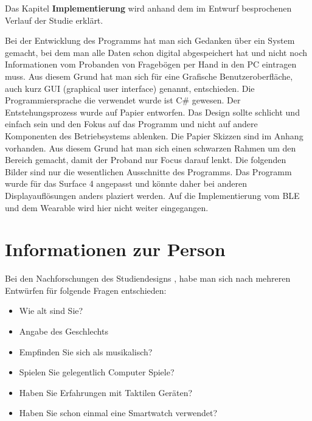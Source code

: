 
Das Kapitel \textbf{Implementierung} wird anhand dem im Entwurf besprochenen Verlauf der Studie erkl{\"a}rt.

Bei der Entwicklung des Programms hat man sich Gedanken {\"u}ber ein System gemacht, bei dem man alle Daten schon digital abgespeichert hat und nicht noch Informationen vom Probanden von Frageb{\"o}gen per Hand in den PC eintragen muss. Aus diesem Grund hat man sich f{\"u}r eine Grafische Benutzeroberfl{\"a}che, auch kurz GUI (graphical user interface) genannt, entschieden. 
Die Programmiersprache die verwendet wurde ist C\# gewesen.
Der Entstehungsprozess wurde auf Papier entworfen. Das Design sollte schlicht und einfach sein und den Fokus auf das Programm und nicht auf andere Komponenten des Betriebsystems ablenken. 
Die Papier Skizzen sind im Anhang vorhanden. Aus diesem Grund hat man sich einen schwarzen Rahmen um den Bereich gemacht, damit der Proband nur Focus darauf lenkt. 
Die folgenden Bilder sind nur die wesentlichen Ausschnitte des Programms. 
Das Programm wurde f{\"u}r das Surface 4 angepasst und k{\"o}nnte daher bei anderen Displayaufl{\"o}sungen anders plaziert werden. 
Auf die Implementierung vom BLE und dem Wearable wird hier nicht weiter eingegangen.

\section{Informationen zur Person}


Bei den Nachforschungen des Studiendesigns \cite{benyon2005designing}, habe man sich nach mehreren Entw{\"u}rfen f{\"u}r folgende Fragen entschieden:

\begin{itemize}
\item Wie alt sind Sie?
\item Angabe des Geschlechts
\item Empfinden Sie sich als musikalisch? 
\item Spielen Sie gelegentlich Computer Spiele?
\item Haben Sie Erfahrungen mit Taktilen Ger{\"a}ten?
\item Haben Sie schon einmal eine Smartwatch verwendet?
\end{itemize}

